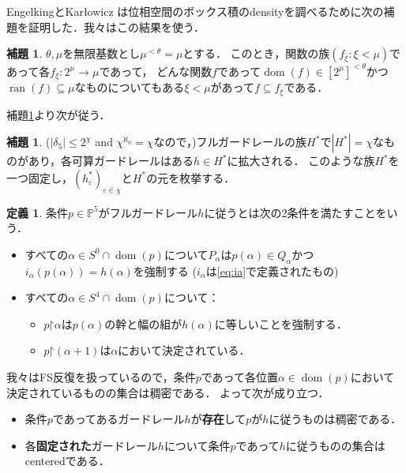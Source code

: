 \documentclass[uplatex,dvipdfmx]{jsarticle}
\newcommand{\range}{\operatorname{ran}}
\newcommand{\dom}{\operatorname{dom}}
\newcommand{\ve}{\varepsilon}
\newcommand{\on}{\mathord\upharpoonright}
\newcommand{\Pa}{\mathbb{P}^5}
\renewcommand\subset{\subseteq}
\theoremstyle{definition}
\newtheorem{defi}[thm]{定義}
\newtheorem{lem}[thm]{補題}
\begin{document}
	EngelkingとKar{\l}owicz \cite{engelking1965some}は位相空間のボックス積のdensityを調べるために次の補題を証明した．我々はこの結果を使う．
	
	\begin{lem}\label{lem:ek}
		$\theta, \mu$を無限基数とし$\mu^{<\theta} = \mu$とする．
		このとき，関数の族$(f_\xi : \xi < \mu)$であって各$f_\xi \colon 2^\mu \to \mu$であって，
		どんな関数$f$であって$\dom(f) \in [2^\mu]^{<\theta}$かつ$\range(f) \subset \mu$なものについてもある$\xi < \mu$があって$f \subset f_\xi$である．
	\end{lem}

	補題\ref{lem:ek}より次が従う．

	\begin{lem}\label{use.EK}
		($|\delta_5|\le 2^\chi$ and $\chi^{\aleph_0}=\chi$なので，)フルガードレールの族$H^*$で$|H^*|=\chi$なものがあり，各可算ガードレールはある$h\in H^*$に拡大される． 
		このような族$H^*$を一つ固定し，$(h^*_\ve)_{\ve\in \chi}$と$H^*$の元を枚挙する．
	\end{lem}

	\begin{defi}
		条件$p\in \Pa$がフルガードレール$h$に従うとは次の2条件を満たすことをいう．
		\begin{itemize}
			\item 
			すべての$\alpha\in S^0 \cap \dom(p)$について$P_\alpha$は$p(\alpha)\in Q_\alpha$かつ$i_\alpha(p(\alpha)) = h(\alpha)$を強制する ($i_\alpha$は\eqref{eq:ia}で定義されたもの)
			\item  すべての$\alpha\in S^4\cap \dom(p)$について：
			\begin{itemize}
				\item  $p\on\alpha$は$p(\alpha)$の幹と幅の組が$h(\alpha)$に等しいことを強制する．
				\item $p \on (\alpha+1)$は$\alpha$において決定されている．
			\end{itemize}
		\end{itemize}       
	\end{defi}

	
	我々はFS反復を扱っているので，条件$p$であって各位置$\alpha\in\dom(p)$において決定されているものの集合は稠密である．
	よって次が成り立つ．
	\begin{itemize}
		\item 条件$p$であってあるガードレール$h$が\textbf{存在}して$p$が$h$に従うものは稠密である．
		\item 
		各\textbf{固定された}ガードレール$h$について条件$p$であって$h$に従うものの集合はcenteredである．
	\end{itemize}
\end{document}
